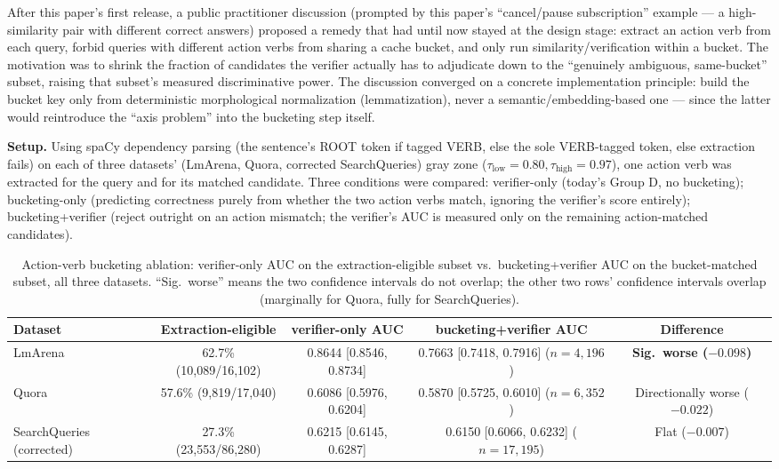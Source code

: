 \documentclass[11pt]{article}
\newcommand{\taulow}{\ensuremath{\tau_{\text{low}}}}
\newenvironment{fittab}{\begin{lrbox}{\fittabbox}}{\end{lrbox}%
  \ifdim\wd\fittabbox>\linewidth\resizebox{\linewidth}{!}{\usebox{\fittabbox}}\else\usebox{\fittabbox}\fi}
\newcommand{\tauhigh}{\ensuremath{\tau_{\text{high}}}}
\begin{document}
After this paper's first release, a public practitioner discussion (prompted by this paper's ``cancel/pause subscription'' example --- a high-similarity pair with different correct answers) proposed a remedy that had until now stayed at the design stage: extract an action verb from each query, forbid queries with different action verbs from sharing a cache bucket, and only run similarity/verification within a bucket. The motivation was to shrink the fraction of candidates the verifier actually has to adjudicate down to the ``genuinely ambiguous, same-bucket'' subset, raising that subset's measured discriminative power. The discussion converged on a concrete implementation principle: build the bucket key only from deterministic morphological normalization (lemmatization), never a semantic/embedding-based one --- since the latter would reintroduce the ``axis problem'' into the bucketing step itself.

\textbf{Setup.} Using spaCy dependency parsing (the sentence's ROOT token if tagged VERB, else the sole VERB-tagged token, else extraction fails) on each of three datasets' (LmArena, Quora, corrected SearchQueries) gray zone ($\taulow=0.80, \tauhigh=0.97$), one action verb was extracted for the query and for its matched candidate. Three conditions were compared: verifier-only (today's Group D, no bucketing); bucketing-only (predicting correctness purely from whether the two action verbs match, ignoring the verifier's score entirely); bucketing+verifier (reject outright on an action mismatch; the verifier's AUC is measured only on the remaining action-matched candidates).

\begin{table}[h]
\centering
\small
\begin{fittab}\begin{tabular}{@{}lcccc@{}}
\toprule
\textbf{Dataset} & \textbf{Extraction-eligible} & \textbf{verifier-only AUC} & \textbf{bucketing+verifier AUC} & \textbf{Difference} \\
\midrule
LmArena & 62.7\% (10{,}089/16{,}102) & 0.8644 [0.8546, 0.8734] & 0.7663 [0.7418, 0.7916] ($n{=}4{,}196$) & \textbf{Sig.\ worse ($-0.098$)} \\
Quora & 57.6\% (9{,}819/17{,}040) & 0.6086 [0.5976, 0.6204] & 0.5870 [0.5725, 0.6010] ($n{=}6{,}352$) & Directionally worse ($-0.022$) \\
SearchQueries (corrected) & 27.3\% (23{,}553/86{,}280) & 0.6215 [0.6145, 0.6287] & 0.6150 [0.6066, 0.6232] ($n{=}17{,}195$) & Flat ($-0.007$) \\
\bottomrule
\end{tabular}\end{fittab}
\caption{Action-verb bucketing ablation: verifier-only AUC on the extraction-eligible subset vs.\ bucketing+verifier AUC on the bucket-matched subset, all three datasets. ``Sig.\ worse'' means the two confidence intervals do not overlap; the other two rows' confidence intervals overlap (marginally for Quora, fully for SearchQueries).}
\end{table}
\end{document}
